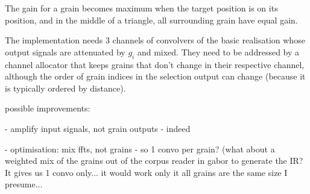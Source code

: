 The gain for a grain becomes maximum when the target position is on its position, and in the middle of a triangle, all surrounding grain have equal gain.

The implementation needs 3 channels of convolvers of the basic realisation whose output signals are attenuated by $g_i$ and mixed.  They need to be addressed by a channel allocator that keeps grains that don't change in their respective channel, although the order of grain indices in the selection output can change (because it is typically ordered by distance).

possible improvements:

- amplify input signals, not grain outputs - indeed

- optimisation: mix ffts, not grains - so 1 convo per grain? (what about a weighted mix of the grains out of the corpus reader in gabor to generate the IR? It gives us 1 convo only... it would work only it all grains are the same size I presume...